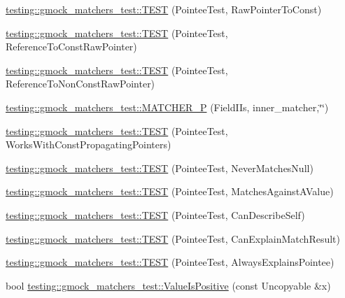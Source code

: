 \begin{DoxyCompactItemize}
\hyperlink{namespacetesting_1_1gmock__matchers__test_a84a21ee7de697401049cb932f859ee33}{testing\+::gmock\+\_\+matchers\+\_\+test\+::\+T\+E\+ST} (Pointee\+Test, Raw\+Pointer\+To\+Const)
\item 
\hyperlink{namespacetesting_1_1gmock__matchers__test_aebba40e49fe790490ba88984fdc7c7a6}{testing\+::gmock\+\_\+matchers\+\_\+test\+::\+T\+E\+ST} (Pointee\+Test, Reference\+To\+Const\+Raw\+Pointer)
\item 
\hyperlink{namespacetesting_1_1gmock__matchers__test_a2d2296f6b23130be225b8df48746dfd5}{testing\+::gmock\+\_\+matchers\+\_\+test\+::\+T\+E\+ST} (Pointee\+Test, Reference\+To\+Non\+Const\+Raw\+Pointer)
\item 
\hyperlink{namespacetesting_1_1gmock__matchers__test_a43d7cb618a83048cd99b55edbec586bb}{testing\+::gmock\+\_\+matchers\+\_\+test\+::\+M\+A\+T\+C\+H\+E\+R\+\_\+P} (Field\+I\+Is, inner\+\_\+matcher,\char`\"{}\char`\"{})
\item 
\hyperlink{namespacetesting_1_1gmock__matchers__test_a9d851a5bb597fa45b5d1cf3f295398e8}{testing\+::gmock\+\_\+matchers\+\_\+test\+::\+T\+E\+ST} (Pointee\+Test, Works\+With\+Const\+Propagating\+Pointers)
\item 
\hyperlink{namespacetesting_1_1gmock__matchers__test_ac778a9cebf9306a5efd27cc1186d8269}{testing\+::gmock\+\_\+matchers\+\_\+test\+::\+T\+E\+ST} (Pointee\+Test, Never\+Matches\+Null)
\item 
\hyperlink{namespacetesting_1_1gmock__matchers__test_afe22e8230dc7a34498e4b2f91dcdd7cd}{testing\+::gmock\+\_\+matchers\+\_\+test\+::\+T\+E\+ST} (Pointee\+Test, Matches\+Against\+A\+Value)
\item 
\hyperlink{namespacetesting_1_1gmock__matchers__test_ac8b9baa938635d587f0b0df1073208e2}{testing\+::gmock\+\_\+matchers\+\_\+test\+::\+T\+E\+ST} (Pointee\+Test, Can\+Describe\+Self)
\item 
\hyperlink{namespacetesting_1_1gmock__matchers__test_a263ede06f6b32a625bb40e4f4c58c8dc}{testing\+::gmock\+\_\+matchers\+\_\+test\+::\+T\+E\+ST} (Pointee\+Test, Can\+Explain\+Match\+Result)
\item 
\hyperlink{namespacetesting_1_1gmock__matchers__test_a00128de027ff6f49f82a7011dd346d43}{testing\+::gmock\+\_\+matchers\+\_\+test\+::\+T\+E\+ST} (Pointee\+Test, Always\+Explains\+Pointee)
\item 
bool \hyperlink{namespacetesting_1_1gmock__matchers__test_a7c429b4fa8a7835724d9e28033e908b2}{testing\+::gmock\+\_\+matchers\+\_\+test\+::\+Value\+Is\+Positive} (const Uncopyable \&x)
\item 

\end{DoxyCompactItemize}
